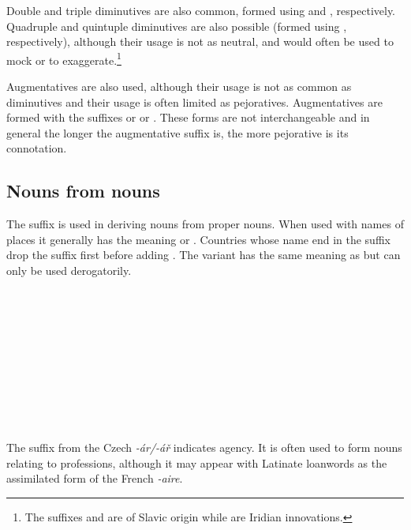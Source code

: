 Double and triple diminutives are also common, formed using  and , respectively. Quadruple and quintuple diminutives are also possible (formed using  , respectively), although their usage is not as neutral, and would often be used to mock or to exaggerate.\footnote{The suffixes  and  are of Slavic origin while   are Iridian innovations.}

Augmentatives are also used, although their usage is not as common as diminutives and their usage is often limited as pejoratives. Augmentatives are formed with the suffixes  or  or . These forms are not interchangeable and in general the longer the augmentative suffix is, the more pejorative is its connotation.

\subsection{Nouns from nouns}

The suffix  is used in deriving nouns from proper nouns. When used with names of places it generally has the meaning  or . Countries whose name end in the suffix  drop the suffix first before adding . The variant  has the same meaning as  but can only be used derogatorily.

\begin{multicols}{2}
  \ex
  \\
  \\
  \\
  \\
  \\
  \\
  \\
  \\
  \\
  \xe
\end{multicols}


The suffix  from the Czech \emph{-ár/-á\v{r}} indicates agency. It is often used to form nouns relating to professions, although it may appear with Latinate loanwords as the assimilated form of the French \emph{-aire}.

